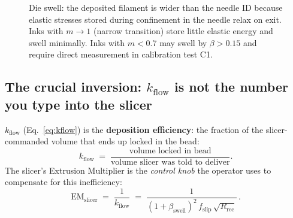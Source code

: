 \documentclass[11pt,a4paper]{article}
\begin{document}
\begin{figure}[h]
\centering
{}
\caption{Die swell: the deposited filament is wider than the needle ID
because elastic stresses stored during confinement in the needle relax
on exit. Inks with $m\to 1$ (narrow transition) store little elastic
energy and swell minimally. Inks with $m<0.7$ may swell by
$\beta>0.15$ and require direct measurement in calibration test C1.}
\label{fig:dieswell}
\end{figure}

\subsection{The crucial inversion: $k_\mathrm{flow}$ is not the number you type into the slicer}
\label{sec:kflow_inversion}

$k_\mathrm{flow}$ (Eq.~\ref{eq:kflow}) is the \textbf{deposition
efficiency}: the fraction of the slicer-commanded volume that ends up
locked in the bead:
\begin{equation}
k_\mathrm{flow}
\;=\;
\frac{\text{volume locked in bead}}
     {\text{volume slicer was told to deliver}}.
\label{eq:kflow_meaning}
\end{equation}
The slicer's Extrusion Multiplier is the \emph{control knob} the
operator uses to compensate for this inefficiency:
\begin{equation}
\boxed{\;\mathrm{EM}_\mathrm{slicer}
\;=\;
\frac{1}{k_\mathrm{flow}}
\;=\;
\frac{1}{(1+\beta_\mathrm{swell})^{2}\,f_\mathrm{slip}\,\sqrt{R_\mathrm{rec}}}\,.\;}
\label{eq:EM_slicer}
\end{equation}
\end{document}
